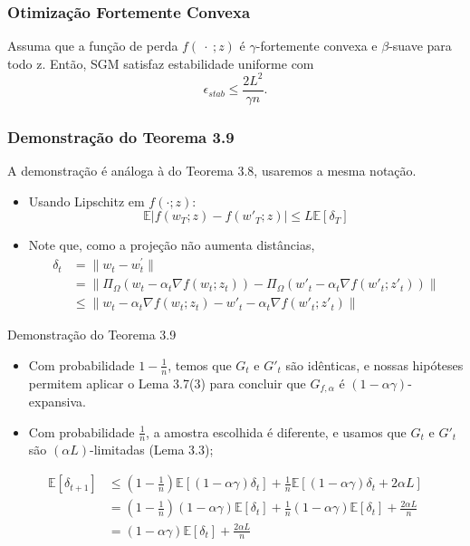 \documentclass{beamer}
\newcommand{\EE}{\mathbb{E}}
\begin{document}
\begin{frame}
\frametitle{Otimização Fortemente Convexa}
\begin{theorem}[3.9]
Assuma que a função de perda $f(\ \cdot\ ;z)$ é \(\gamma\)-fortemente convexa e \(\beta\)-suave para todo z.  Então, SGM satisfaz estabilidade uniforme com
$$ \epsilon_{stab} \le \frac{2L^2}{\gamma n}. $$ 
\end{theorem}
\end{frame}

\begin{frame}
\frametitle{Demonstração do Teorema 3.9} 
A demonstração é análoga à do Teorema 3.8, usaremos a mesma notação.
\begin{itemize}
    \item Usando Lipschitz em \(f(\cdot;z)\):
    \begin{equation*}\tag{3.8}
        \EE|f(w_{T};z) - f(w'_{T};z)| \le L\EE[\delta_T]
    \end{equation*}
    \item Note que, como a projeção não aumenta distâncias,
    \begin{align*}
        \delta_t &= \|w_t - w_t^\prime\| \\ &= \|\Pi_{\Omega}(w_t - \alpha_t \nabla f(w_t;z_t)) - \Pi_{\Omega}(w'_t - \alpha_t \nabla f(w'_t;z'_t))\| \\
        &\le \|w_t - \alpha_t \nabla f(w_t;z_t) -  w'_t - \alpha_t \nabla f(w'_t;z'_t)\| 
    \end{align*}
    
\end{itemize}
\end{frame}

\begin{frame}{Demonstração do Teorema 3.9} 
    \begin{itemize} 
    \item   Com probabilidade \(1-\frac{1}{n}\), temos que \(G_t\) e \(G'_t\) são idênticas, e nossas hipóteses permitem aplicar o Lema 3.7(3) para concluir que \(G_{f,\alpha}\) é \((1-\alpha\gamma)\)-expansiva.
    \item Com probabilidade \(\frac{1}{n}\), a amostra escolhida é diferente, e usamos que \(G_t\) e \(G'_t\) são \((\alpha L)\)-limitadas (Lema 3.3);
    \end{itemize}
    \begin{align*}\tag{3.9}
        \EE[\delta_{t+1}] &\le \left(1-\frac{1}{n}\right)\EE[(1-\alpha\gamma)\delta_t] + \frac{1}{n}\EE[(1-\alpha\gamma)\delta_t + 2\alpha L] \\
        &= (1-\frac{1}{n})(1-\alpha\gamma)\EE[\delta_t] + \frac{1}{n}(1-\alpha\gamma)\EE[\delta_t] + \frac{2\alpha L}{n}   \\
        &= (1-\alpha\gamma)\EE[\delta_t] + \frac{2\alpha L}{n}     
    \end{align*}
\end{frame}
\end{document}
